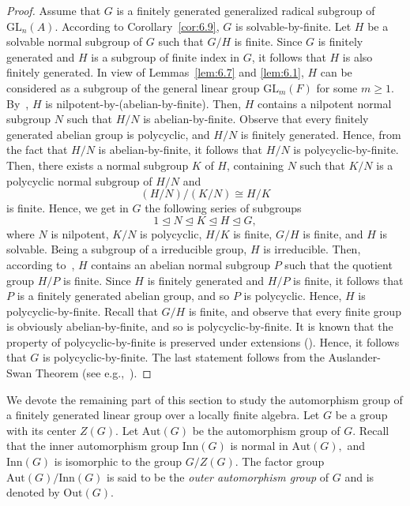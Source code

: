 \documentclass{amsart}
\theoremstyle{definition}
\begin{document}
\begin{proof} Assume that $G$ is a finitely generated generalized radical subgroup of $\mathrm{GL}_n(A).$ According to Corollary~\ref{cor:6.9}, $G$ is solvable-by-finite.
Let $H$ be a solvable normal subgroup of $G$ such that $G/H$ is finite. Since $G$ is finitely generated and $H$ is a subgroup of finite index in $G$, it follows that $H$ is also finitely generated. In view of Lemmas~\ref{lem:6.7} and \ref{lem:6.1}, $H$ can be considered as a subgroup of the  general linear group $\mathrm{GL}_m(F)$ for some $m\geq 1.$ By~\cite[Theorem 1.4.7]{Bo_Dixon_2017}, $H$ is nilpotent-by-(abelian-by-finite). Then, $H$ contains a nilpotent normal subgroup $N$ such that $H/N$ is abelian-by-finite. Observe that every finitely generated abelian group is polycyclic, and $H/N$ is finitely generated. Hence, from the fact that $H/N$ is abelian-by-finite, it follows that $H/N$ is polycyclic-by-finite. Then, there exists a normal subgroup $K$ of $H$, containing $N$ such that $K/N$ is a polycyclic normal subgroup of $H/N$ and $$(H/N)/(K/N)\cong H/K$$
is finite. Hence, we get in $G$ the following series of subgroups
$$1\trianglelefteq N\trianglelefteq K\trianglelefteq H\trianglelefteq G,$$ 
where $N$ is nilpotent, $K/N$ is polycyclic, $H/K$ is finite, $G/H$ is finite, and $H$ is solvable.
Being a subgroup of a irreducible group, $H$ is irreducible. Then, according to~\cite[Theorem 1.4.6]{Bo_Dixon_2017}, $H$ contains an abelian normal subgroup $P$ such that the quotient group $H/P$ is finite. Since $H$ is finitely generated and $H/P$ is finite, it follows that $P$ is a finitely generated abelian group, and so $P$ is polycyclic. Hence, $H$ is polycyclic-by-finite. Recall that $G/H$ is finite, and observe that every finite group is obviously abelian-by-finite, and so is polycyclic-by-finite. It is known that the property of polycyclic-by-finite is preserved under extensions (\cite[Proposition~5.7]{Bo_SilberBAdd_2021}). Hence, it follows that $G$ is polycyclic-by-finite. The last statement follows from 
the Auslander-Swan Theorem (see e.g.,~\cite[3.3.1]{Bo_Lennox_2004}).
\end{proof}

We devote the remaining part of this section to study the automorphism group of a finitely generated linear group over a locally finite algebra.  Let $G$ be a group with its center $Z(G).$ Let $\mathrm{Aut}(G)$ be the automorphism group of $G.$ Recall that the inner automorphism group $\mathrm{Inn}(G)$ is normal in $\mathrm{Aut}(G),$ and $\mathrm{Inn}(G)$ is isomorphic to the group $G/Z(G).$ The factor group $\mathrm{Aut}(G)/\mathrm{Inn}(G)$ is said to be the \textit{outer automorphism group} of $G$ and is denoted by $\mathrm{Out}(G).$ 
\end{document}
